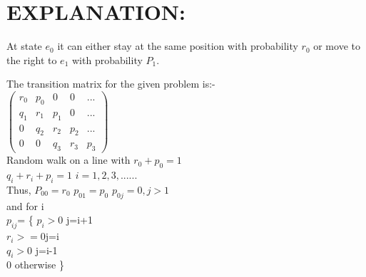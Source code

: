 \documentclass{beamer}
\newcommand{\myvec}[1]{\ensuremath{\begin{pmatrix}#1\end{pmatrix}}}
\begin{document}
\section{EXPLANATION:}
\begin{frame}{}
At state $e_0$ it can either stay at the same position with probability $r_0$ or move 
to the right to $e_1$ with probability $P_1$.

The transition matrix for the given problem is:- \\
 \myvec{r_0&p_0&0&0&...\\q_1&r_1&p_1&0&...\\0&q_2&r_2&p_2&...\\0&0&q_3&r_3&p_3}\\

Random walk on a line with $ r_0+p_0=1 $ \\
$q_i+r_i+p_i=1 $ \hspace $ i=1,2,3,$......\\
Thus, $P_{00}=r_{0}$  \hspace  $p_{01}=p_0$  \hspace \hspace  $p_{0j}=0 , j>1 $ \\
and for i  \\


$p_{ij}$=  \hspace \{  $p_i>0 $ \hspace j=i+1\\
                  $r_i >=0 $\hspace j=i\\
                  $q_i >0 $ \hspace j=i-1\\
                  0 \hspace otherwise  \}
                 
             \\
            \end{frame}
\end{document}
